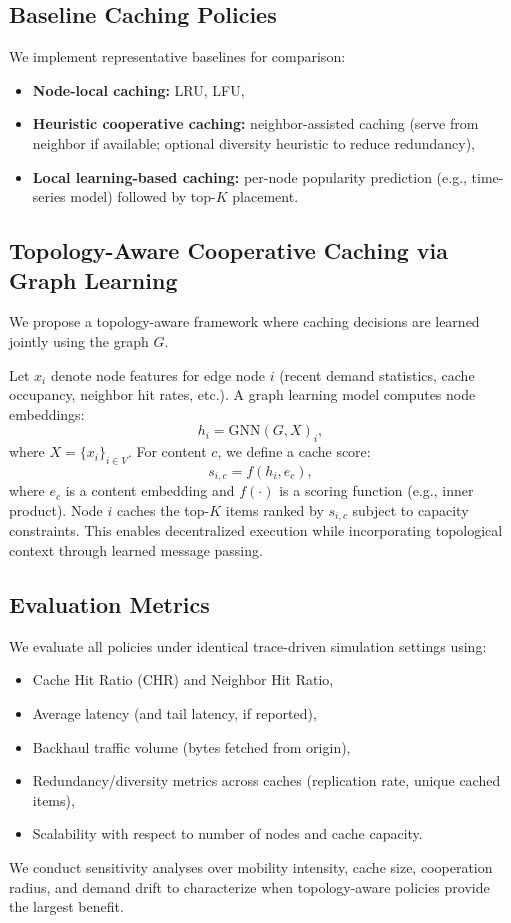 \subsection{Baseline Caching Policies}
We implement representative baselines for comparison:
\begin{itemize}
    \item \textbf{Node-local caching:} LRU, LFU,
    \item \textbf{Heuristic cooperative caching:} neighbor-assisted caching (serve from neighbor if available; optional diversity heuristic to reduce redundancy),
    \item \textbf{Local learning-based caching:} per-node popularity prediction (e.g., time-series model) followed by top-$K$ placement.
\end{itemize}

\subsection{Topology-Aware Cooperative Caching via Graph Learning}
We propose a topology-aware framework where caching decisions are learned jointly using the graph $G$.

Let $x_i$ denote node features for edge node $i$ (recent demand statistics, cache occupancy, neighbor hit rates, etc.). A graph learning model computes node embeddings:
\[
h_i = \mathrm{GNN}(G, X)_i,
\]
where $X = \{x_i\}_{i \in V}$. For content $c$, we define a cache score:
\[
s_{i,c} = f(h_i, e_c),
\]
where $e_c$ is a content embedding and $f(\cdot)$ is a scoring function (e.g., inner product). Node $i$ caches the top-$K$ items ranked by $s_{i,c}$ subject to capacity constraints. This enables decentralized execution while incorporating topological context through learned message passing.

\subsection{Evaluation Metrics}
We evaluate all policies under identical trace-driven simulation settings using:
\begin{itemize}
    \item Cache Hit Ratio (CHR) and Neighbor Hit Ratio,
    \item Average latency (and tail latency, if reported),
    \item Backhaul traffic volume (bytes fetched from origin),
    \item Redundancy/diversity metrics across caches (replication rate, unique cached items),
    \item Scalability with respect to number of nodes and cache capacity.
\end{itemize}
We conduct sensitivity analyses over mobility intensity, cache size, cooperation radius, and demand drift to characterize when topology-aware policies provide the largest benefit.
